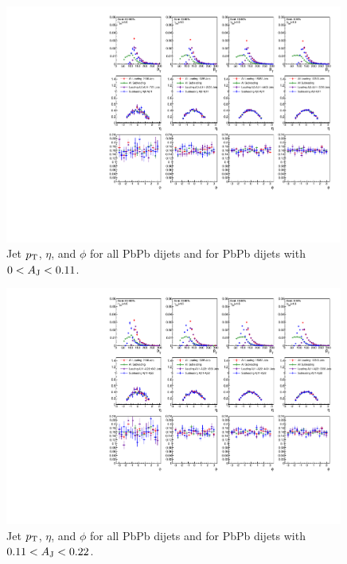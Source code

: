 \begin{figure}[htbp]
\begin{center}
\includegraphics[width=0.99\textwidth]{figures/Appendices/JetSummary_PbPb_Aj0_Aj11.pdf}
\caption{Jet $p_{\rm T}$, $\eta$, and $\phi$ for all PbPb dijets and for PbPb dijets with  $0<A_{\rm J}<0.11$.  
}
\label{fig:JetKinPbPbAj0Aj11}
\end{center}
\end{figure}

\begin{figure}[htbp]
\begin{center}
\includegraphics[width=0.99\textwidth]{figures/Appendices/JetSummary_PbPb_Aj11_Aj22.pdf}
\caption{
Jet $p_{\rm T}$, $\eta$, and $\phi$ for all PbPb dijets and for PbPb dijets with $0.11<A_{\rm J}<0.22$.  
}
\label{fig:JetKinPbPbAj11Aj22}
\end{center}
\end{figure}

